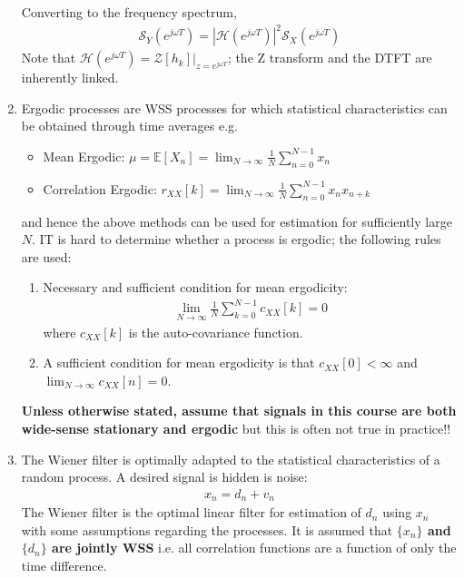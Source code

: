 \documentclass[a4paper]{article}
\newcommand{\ix}[1]{%
  \leavevmode %
  \marginpar{\small\emph{#1}}%
}
\begin{document}
\begin{enumerate}
Converting to the frequency spectrum, 
\begin{align*}
\mathcal{S}_Y(e^{j \omega T}) = |\mathcal{H}(e^{j \omega T})|^2 \mathcal{S}_X(e^{j \omega T})
\end{align*}
Note that $\mathcal{H}(e^{j \omega T}) = \mathcal{Z}[h_k]|_{z=e^{j \omega T}}$; the Z transform and the DTFT are inherently linked.

\item\ix{Ergodicity} Ergodic processes are WSS processes for which statistical characteristics can be obtained through time averages e.g.
\begin{itemize}
\item Mean Ergodic: $\mu = \mathbb{E}[X_n] = \lim_{N\rightarrow\infty} \frac{1}{N} \sum_{n=0}^{N-1}x_n$

\item Correlation Ergodic: $r_{XX}[k] =  \lim_{N\rightarrow\infty} \frac{1}{N} \sum_{n=0}^{N-1}x_nx_{n+k}$
\end{itemize}
and hence the above methods can be used for estimation for sufficiently large $N$. IT is hard to determine whether a process is ergodic; the following rules are used:
\begin{enumerate}
\item Necessary and sufficient condition for mean ergodicity:
\begin{align*}
\lim_{N\rightarrow\infty} \frac{1}{N} \sum_{k=0}^{N-1} c_{XX}[k] = 0
\end{align*}
where $c_{XX}[k]$ is the auto-covariance function. 

\item A sufficient condition for mean ergodicity is that $c_{XX}[0] < \infty $ and $\lim_{N\rightarrow\infty} c_{XX}[n] = 0$.
\end{enumerate}
\textbf{Unless otherwise stated, assume that signals in this course are both wide-sense stationary and ergodic} but this is often not true in practice!!

\item\ix{The Wiener Filter} The Wiener filter is optimally adapted to the statistical characteristics of a random process. A desired signal is hidden is noise:
\begin{align*}
x_n = d_n + v_n
\end{align*}
The Wiener filter is the optimal linear filter for estimation of $d_n$ using $x_n$ with some assumptions regarding the processes. It is assumed that \textbf{$\lbrace x_n \rbrace$ and $\lbrace d_n \rbrace$ are jointly WSS} i.e. all correlation functions are a function of only the time difference. 


\end{enumerate}
\end{document}
